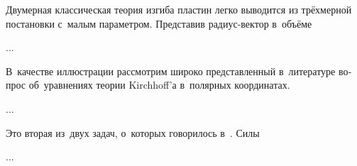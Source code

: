 \begin{otherlanguage}{russian}

Двумерная классическая теория изгиба пластин легко выводится из трёхмерной постановки с~малым параметром.
Представив радиус\hbox{-}вектор в~объёме

...



\end{otherlanguage}



\begin{otherlanguage}{russian}

В~качестве иллюстрации рассмотрим широко представленный в~литературе вопрос об~уравнениях теории Kirchhoff’а в~полярных координатах.

...



\end{otherlanguage}



\begin{otherlanguage}{russian}

Это вторая из~двух задач, о~которых говорилось в~.
Силы

...




\end{otherlanguage}

